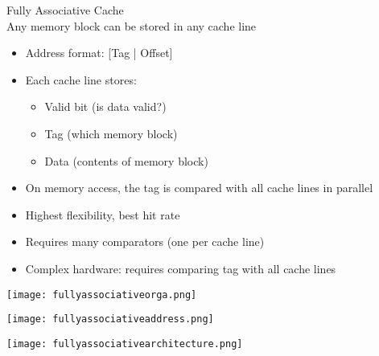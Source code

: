 \begin{concept}{Fully Associative Cache}\\
    Any memory block can be stored in any cache line
\begin{itemize}
    \item Address format: [Tag | Offset]
    \item Each cache line stores:
    \begin{itemize}
        \item Valid bit (is data valid?)
        \item Tag (which memory block)
        \item Data (contents of memory block)
    \end{itemize}
    \item On memory access, the tag is compared with all cache lines in parallel
    \item Highest flexibility, best hit rate
    \item Requires many comparators (one per cache line)
    \item Complex hardware: requires comparing tag with all cache lines
\end{itemize}
\vspace{2mm}

\begin{minipage}{0.5\linewidth}
\texttt{[image: fullyassociativeorga.png]}
\end{minipage}
\begin{minipage}{0.5\linewidth}
\texttt{[image: fullyassociativeaddress.png]}
\end{minipage}

\begin{center}
\texttt{[image: fullyassociativearchitecture.png]}
\end{center}

\end{concept}


